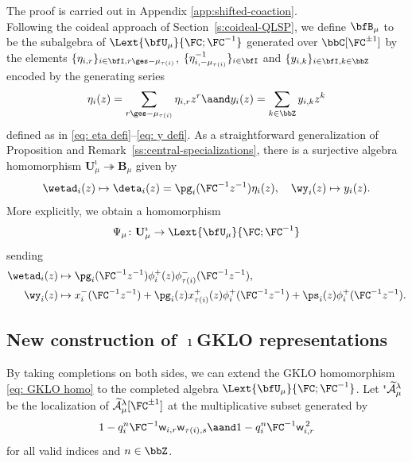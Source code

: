 \documentclass[reqno]{amsart}
\numberwithin{equation}{section}
\begin{document}
The proof is carried out in Appendix \ref{app:shifted-coaction}.\\

Following the coideal approach of Section~\ref{s:coideal-QLSP}, we define $\bfB_\mu$ 
to be the subalgebra of $\Lext{\bfU_\mu}{\FC;\FC^{-1}}$ generated over 
$\bbC[\FC^{\pm1}]$ by the elements
$\{\eta_{i,r}\}_{i\in\bfI,r\ges - \mu_{\tau(i)}}$, $\{\eta_{i,-\mu_{\tau(i)}}^{-1}\}_{i\in\bfI}$ 
and $\{y_{i,k}\}_{i\in\bfI, k\in\bbZ}$ encoded by the generating series 
\begin{equation}
	\eta_{i}(z)=\sum_{r\ges-\mu_{\tau(i)}}\eta_{i,r}z^r\aand 
	y_i(z)=\sum_{k\in\bbZ}y_{i,k}z^k
\end{equation}
defined as in \eqref{eq: eta defi}--\eqref{eq: y defi}. As a straightforward generalization of Proposition and  Remark~\ref{ss:central-specializations}, there is a surjective algebra homomorphism $\mathbf{U}^\imath_\mu \twoheadrightarrow \mathbf{B}_\mu$ given by
\[
\wetad_{i}(z) \mapsto \deta_i(z)=\pg_i(\FC^{-1}z^{-1})\eta_i(z), \quad 
\wy_i(z) \mapsto y_i(z). 
\]
More explicitly, we obtain a homomorphism
\[
\Psi_\mu \colon \mathbf{U}^\imath_\mu \to \Lext{\bfU_\mu}{\FC;\FC^{-1}}
\]
sending 
\begin{align}\label{eq: igklo i emb}
	\begin{split} 
		\wetad_{i}(z) &\mapsto \pg_i(\FC^{-1}z^{-1}) \phi_{i}^{+}(z) \phi_{\tau(i)}^{-}(\FC^{-1}{z}^{-1}),\\ 
		\wy_i(z) &\mapsto x_{i}^{-}(\FC^{-1}{z}^{-1}) + \pg_{i}(z) x_{\tau(i)}^{+}(z) \phi_{i}^{+}(\FC^{-1} z^{-1}) + \ps_{i}(z) \phi_{i}^{+}(\FC^{-1}z^{-1}).
	\end{split}
\end{align}

\subsection{New construction of $\imath$GKLO representations} \label{ss: iGKLO}

By taking completions on both sides, we can extend the GKLO homomorphism 
\eqref{eq: GKLO homo} to the completed algebra $\Lext{\bfU_\mu}{\FC;\FC^{-1}}$. 
Let ${}^\imath\widetilde{\mathcal{A}}^\lambda_\mu$ be the localization of 
$\widetilde{\diff}^\lambda_\mu[\FC^{\pm1}]$ at the multiplicative subset generated by 
\[
1-q_i^n\FC^{-1}\mathsf w_{i,r}\mathsf w_{\tau(i),s}
\aand
1-q_i^n\FC^{-1}\mathsf w_{i,r}^{\,2}
\]
for all valid indices and $n\in\bbZ$.\\ 
\end{document}

